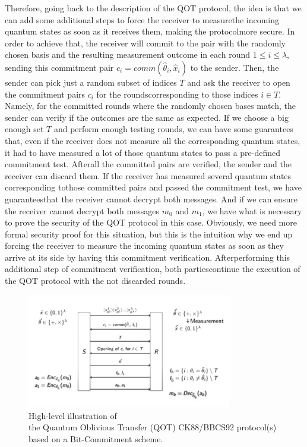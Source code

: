 \documentclass[12pt]{article}
\begin{document}
    \noindent Therefore, going back to the description of the QOT protocol, the idea is that we can add some additional steps to force the receiver to measure\break the incoming quantum states as soon as it receives them, making the protocol\break more secure. In order to achieve that, the receiver will commit to the pair with the randomly chosen basis and the resulting measurement outcome in each round $1 \leq i \leq \lambda$, sending this commitment pair ${c}_{i} = comm( {\hat{\theta}}_{i}, {\hat{x}}_{i} )$ to the sender. Then, the sender can pick just a random subset of indices $T$ and ask the receiver to open the commitment pairs ${c}_{i}$ for the rounds\break corresponding to those indices $i \in T$. Namely, for the committed rounds where the randomly chosen bases match, the sender can verify if the outcomes are the same as expected. If we choose a big enough set $T$ and perform enough testing rounds, we can have some guarantees that, even if the receiver does not measure all the corresponding quantum states, it had to have measured a lot of those quantum states to pass a pre-defined commitment test. After\break all the committed pairs are verified, the sender and the receiver can discard them. If the receiver has measured several quantum states corresponding to\break those committed pairs and passed the commitment test, we have guarantees\break that the receiver cannot decrypt both messages. And if we can ensure the receiver cannot decrypt both messages ${m}_{0}$ and ${m}_{1}$, we have what is necessary to prove the security of the QOT protocol in this case. Obviously, we need more formal security proof for this situation, but this is the intuition why we end up forcing the receiver to measure the incoming quantum states as soon as they arrive at its side by having this commitment verification. After\break performing this additional step of commitment verification, both parties\break continue the execution of the QOT protocol with the not discarded rounds.

   \begin{figure}[ht]
        \captionsetup{justification=centering}
        \centering
        \includegraphics[width=0.8\textwidth]{figures/images/img-11.pdf}
        \caption{High-level illustration of\\ the Quantum Oblivious Transfer (QOT) CK88/BBCS92 protocol(s)\\ based on a Bit-Commitment scheme.}
        \label{fig:quantum-oblivious-transfer-ck88-bbcs92-protocols-based-bit-commitment-scheme}
    \end{figure}
\end{document}
